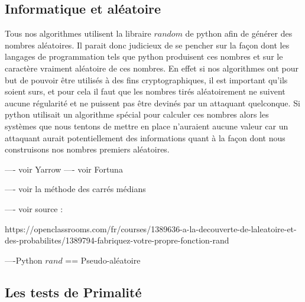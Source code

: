 \documentclass{article}
\begin{document}
\subsection{Informatique et aléatoire}
Tous nos algorithmes utilisent la libraire $random$ de python afin de générer des nombres aléatoires. Il parait donc judicieux de se pencher sur la façon dont les langages de programmation tels que python produisent ces nombres et sur le caractère vraiment aléatoire de ces nombres.
En effet si nos algorithmes ont pour but de pouvoir être utilisés à des fins cryptographiques, il est important qu'ils soient surs, et pour cela il faut que les nombres tirés aléatoirement ne suivent aucune régularité et ne puissent pas être devinés par un attaquant quelconque.
Si python utilisait un algorithme spécial pour calculer ces nombres alors les systèmes que nous tentons de mettre en place n'auraient aucune valeur car un attaquant aurait potentiellement des informations quant à la façon dont nous construisons nos nombres premiers aléatoires. \newline

---- voir  Yarrow \newline
---- voir  Fortuna \newline


---- voir la méthode des carrés médians

---- voir source : \newline

https://openclassrooms.com/fr/courses/1389636-a-la-decouverte-de-laleatoire-et-des-probabilites/1389794-fabriquez-votre-propre-fonction-rand
\newline

----Python $rand$ == Pseudo-aléatoire



\subsection{Les tests de Primalité}
\end{document}
